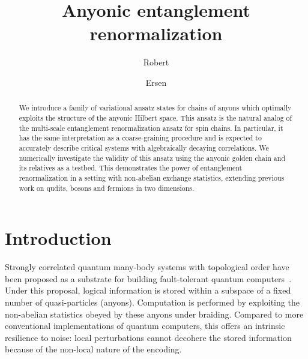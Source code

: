 \documentclass[floats,prb,twocolumn]{revtex4}
\newcommand{\mypacs}[1]{\begin{flushleft} {\small PACS numbers: #1}\end{flushleft}}
\begin{document}
\title{Anyonic entanglement renormalization}
\author{Robert }
\author{Ersen }
\begin{abstract}
We introduce a family of variational ansatz states for chains of anyons which optimally exploits the structure of the anyonic Hilbert space.  This ansatz is the natural analog of  the multi-scale entanglement renormalization ansatz for spin chains. In particular, it has the same interpretation as a coarse-graining procedure and is expected to accurately describe critical systems with algebraically decaying correlations. We numerically investigate the validity of this ansatz using the anyonic golden chain and its relatives as a testbed. This demonstrates the power of entanglement renormalization in a setting with non-abelian exchange statistics, extending previous work on qudits, bosons and fermions in two dimensions. 
\end{abstract}
\maketitle

\section{Introduction} 
Strongly correlated quantum many-body systems with topological order have been proposed as a substrate for building fault-tolerant quantum computers~\cite{Kitaev03,preskill,Freedmanetal03,Nayaketal08}. Under this proposal, logical information is stored within a subspace of a fixed number of quasi-particles (anyons). Computation is performed by 
exploiting the non-abelian statistics obeyed by these anyons under braiding. Compared to more conventional implementations of quantum computers, this offers an intrinsic resilience to noise: local perturbations cannot decohere the stored information because of the non-local nature of the encoding. 
\end{document}
